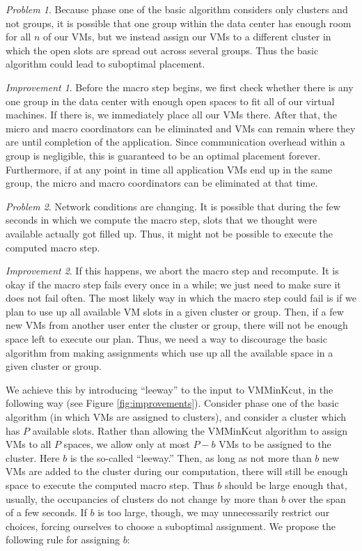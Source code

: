 \documentclass[11pt]{article}
\begin{document}
\begin{trivlist}
\item \textit{Problem 1}. Because phase one of the basic algorithm considers only clusters and not groups, it is possible that one group within the data center has enough room for all $n$ of our VMs, but we instead assign our VMs to a different cluster in which the open slots are spread out across several groups.  Thus the basic algorithm could lead to suboptimal placement.

\item \textit{Improvement 1}. Before the macro step begins, we first check whether there is any one group in the data center with enough open spaces to fit all of our virtual machines.  If there is, we immediately place all our VMs there.  After that, the micro and macro coordinators can be eliminated and VMs can remain where they are until completion of the application.  Since communication overhead within a group is negligible, this is guaranteed to be an optimal placement forever.  Furthermore, if at any point in time all application VMs end up in the same group, the micro and macro coordinators can be eliminated at that time.

\item \textit{Problem 2}. Network conditions are changing.  It is possible that during the few seconds in which we compute the macro step, slots that we thought were available actually got filled up.  Thus, it might not be possible to execute the computed macro step.

\item \textit{Improvement 2}. If this happens, we abort the macro step and recompute.  It is okay if the macro step fails every once in a while; we just need to make sure it does not fail often.  The most likely way in which the macro step could fail is if we plan to use up all available VM slots in a given cluster or group.  Then, if a few new VMs from another user enter the cluster or group, there will not be enough space left to execute our plan.  Thus, we need a way to discourage the basic algorithm from making assignments which use up all the available space in a given cluster or group.

  We achieve this by introducing ``leeway'' to the input to VMMinKcut, in the following way (see Figure \ref{fig:improvements}).  Consider phase one of the basic algorithm (in which VMs are assigned to clusters), and consider a cluster which has $P$ available slots.  Rather than allowing the VMMinKcut algorithm to assign VMs to all $P$ spaces, we allow only at most $P-b$ VMs to be assigned to the cluster.  Here $b$ is the so-called ``leeway.''  Then, as long as not more than $b$ new VMs are added to the cluster during our computation, there will still be enough space to execute the computed macro step.  Thus $b$ should be large enough that, usually, the occupancies of clusters do not change by more than $b$ over the span of a few seconds.  If $b$ is too large, though, we may unnecessarily restrict our choices, forcing ourselves to choose a suboptimal assignment.  We propose the following rule for assigning $b$:


\end{trivlist}
\end{document}
